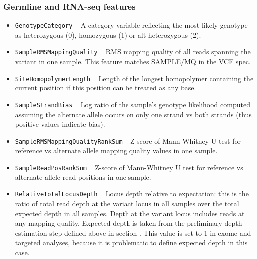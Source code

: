 \documentclass{article}
\begin{document}
\subsubsection{Germline and RNA-seq features}
\begin{itemize}

    \item \texttt{GenotypeCategory} ~ A category variable reflecting the most likely genotype as heterozygous (0), homozygous (1) or alt-heterozygous (2).

    \item \texttt{SampleRMSMappingQuality} ~ RMS mapping quality of all reads spanning the variant in one sample. This feature matches SAMPLE/MQ in the VCF spec.

    \item \texttt{SiteHomopolymerLength} ~ Length of the longest homopolymer containing the current position if this position can be treated as any base.

    \item \texttt{SampleStrandBias} ~ Log ratio of the sample's genotype likelihood computed assuming the alternate allele occurs on only one strand vs both strands (thus positive values indicate bias).

    \item \texttt{SampleRMSMappingQualityRankSum} ~ Z-score of Mann-Whitney U test for reference vs alternate allele mapping quality values in one sample.

    \item \texttt{SampleReadPosRankSum} ~ Z-score of Mann-Whitney U test for reference vs alternate allele read positions in one sample.

    \item \texttt{RelativeTotalLocusDepth} ~ Locus depth relative to expectation: this is the ratio of total read depth at the variant locus in all samples over the total expected depth in all samples. Depth at the variant locus includes reads at any mapping quality. Expected depth is taken from the preliminary depth estimation step defined above in section . This value is set to 1 in exome and targeted analyses, because it is problematic to define expected depth in this case.


\end{itemize}
\end{document}

